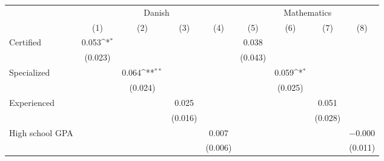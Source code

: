 {
\def\sym#1{\ifmmode^{#1}\else\(^{#1}\)\fi}
\begin{tabular*}{\hsize}{@{\hskip\tabcolsep\extracolsep\fill}l*{8}{c}}
\toprule
                    &\multicolumn{4}{c}{Danish}                                                             &\multicolumn{4}{c}{Mathematics}                                                        \\\cmidrule(lr){2-5}\cmidrule(lr){6-9}
                    &\multicolumn{1}{c}{(1)}         &\multicolumn{1}{c}{(2)}         &\multicolumn{1}{c}{(3)}         &\multicolumn{1}{c}{(4)}         &\multicolumn{1}{c}{(5)}         &\multicolumn{1}{c}{(6)}         &\multicolumn{1}{c}{(7)}         &\multicolumn{1}{c}{(8)}         \\
\midrule
Certified           &       0.053\sym{*}  &                     &                     &                     &       0.038         &                     &                     &                     \\
                    &     (0.023)         &                     &                     &                     &     (0.043)         &                     &                     &                     \\
\addlinespace
Specialized         &                     &       0.064\sym{**} &                     &                     &                     &       0.059\sym{*}  &                     &                     \\
                    &                     &     (0.024)         &                     &                     &                     &     (0.025)         &                     &                     \\
\addlinespace
Experienced         &                     &                     &       0.025         &                     &                     &                     &       0.051         &                     \\
                    &                     &                     &     (0.016)         &                     &                     &                     &     (0.028)         &                     \\
\addlinespace
High school GPA     &                     &                     &                     &       0.007         &                     &                     &                     &    $-$0.000         \\
                    &                     &                     &                     &     (0.006)         &                     &                     &                     &     (0.011)         \\

\end{tabular*}}
